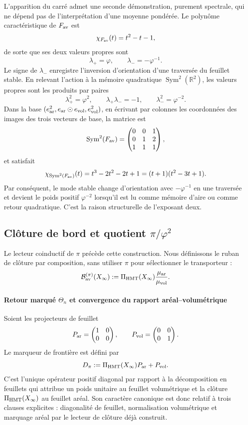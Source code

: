 L'apparition du carré admet une seconde démonstration, purement
spectrale, qui ne dépend pas de l'interprétation d'une moyenne pondérée. Le polynôme
caractéristique de \(F_{\rm av}\) est
\[
 \chi_{F_{\rm av}}(t)=t^2-t-1,
\]
de sorte que ses deux valeurs propres sont
\[
 \lambda_+=\varphi,\qquad \lambda_-=-\varphi^{-1}.
\]
Le signe de \(\lambda_-\) enregistre l'inversion d'orientation d'une
traversée du feuillet stable. En relevant l'action à la mémoire quadratique
\(\operatorname{Sym}^2(\mathbb R^2)\), les valeurs propres sont les produits
par paires
\[
 \lambda_+^2=\varphi^2,\qquad
 \lambda_+\lambda_-=-1,\qquad
 \lambda_-^2=\varphi^{-2}.
\]
Dans la base
\((e_{\rm ar}^2,e_{\rm ar}\odot e_{\rm vol},e_{\rm vol}^2)\), en écrivant
par colonnes les coordonnées des images des trois vecteurs de base, la
matrice est
\[
 \operatorname{Sym}^2(F_{\rm av})=
 \begin{pmatrix}
 0&0&1\\
 0&1&2\\
 1&1&1
 \end{pmatrix},
\]
et satisfait
\[
 \chi_{\operatorname{Sym}^2(F_{\rm av})}(t)
 =t^3-2t^2-2t+1
 =(t+1)(t^2-3t+1).
\]
Par conséquent, le mode stable change d'orientation avec
\(-\varphi^{-1}\) en une traversée et devient le poids positif
\(\varphi^{-2}\) lorsqu'il est lu comme mémoire d'aire ou comme retour
quadratique. C'est la raison structurelle de l'exposant deux.

\subsection{Clôture de bord et quotient \texorpdfstring{$\pi/\varphi^2$}{pi/phi2}}

Le lecteur coinductif de \(\pi\) précède cette construction. Nous définissons le
ruban de clôture par composition, sans utiliser \(\pi\) pour sélectionner le
transporteur :
\[
 \mathcal B_{\rm av}^{(\pi)}(X_\infty)
 :=\Pi_{\rm HMT}(X_\infty)
 \frac{\mu_{\rm ar}}{\mu_{\rm vol}}.
\]

\paragraph{Retour marqué \(\Theta_n\) et convergence du rapport aréal–volumétrique}
Soient les projecteurs de feuillet
\[
 P_{\rm ar}=\begin{pmatrix}1&0\\0&0\end{pmatrix},
 \qquad
 P_{\rm vol}=\begin{pmatrix}0&0\\0&1\end{pmatrix}.
\]
Le marqueur de frontière est défini par
\[
 D_\pi:=\Pi_{\rm HMT}(X_\infty)P_{\rm ar}+P_{\rm vol}.
\]
C'est l'unique opérateur positif diagonal par rapport à la décomposition en
feuillets qui attribue un poids unitaire au feuillet volumétrique et la clôture
\(\Pi_{\rm HMT}(X_\infty)\) au feuillet aréal. Son caractère canonique est donc
relatif à trois clauses explicites : diagonalité de feuillet, normalisation
volumétrique et marquage aréal par le lecteur de clôture déjà construit.


